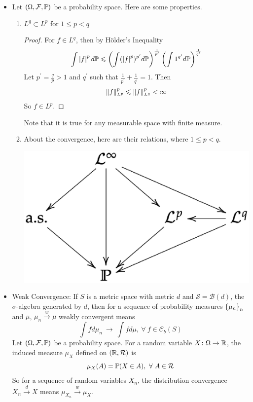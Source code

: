 \documentclass[a4paper,12pt]{article}
\begin{document}
\begin{itemize}
  \item Let $(\Omega,\mathcal{F},\mathbb{P})$ be a probability space. Here are some properties.
  \begin{enumerate}[label=(\arabic*)]
    \item $L^q \subset L^p$ for $1 \leqslant p < q$
    \begin{proof}
      For $f \in L^q$, then by H\"older's Inequality
      \begin{equation*}
        \int \left\lvert f\right\lvert^p d\mathbb{P} \leqslant \left(\int (\left\lvert f\right\lvert^p)^{p^{\prime}} d\mathbb{P}\right)^{\frac{1}{p^{\prime}}}\left(\int 1^{q^{\prime}} d\mathbb{P}\right)^{\frac{1}{q^{\prime}}}
      \end{equation*}
      Let $p^{\prime} = \frac{q}{p} > 1$ and $q^{\prime}$ such that $\frac{1}{p^{\prime}}+\frac{1}{q^{\prime}}=1$. Then
      \begin{equation*}
        \left\lVert f\right\lVert_{L^p}^p \leqslant \left\lVert f\right\lVert_{L^q}^{p} < \infty
      \end{equation*}
      So $f \in L^p$.
    \end{proof}
    Note that it is true for any measurable space with finite measure.

    \item About the convergence, here are their relations, where $1 \leqslant p < q$.
    \begin{center}
      \includegraphics[scale=0.5]{1.eps}
    \end{center}
  \end{enumerate}

  \item Weak Convergence: If $S$ is a metric space with metric $d$ and $\mathcal{S} = \mathcal{B}(d)$, the $\sigma$-algebra generated by $d$, then for a sequence of probability measures $\left\{\mu_n\right\}_n$ and $\mu$, $\mu_n \xrightarrow{w} \mu$ weakly convergent means
  \begin{equation*}
    \int f d\mu_n~ \longrightarrow ~ \int f d\mu,~\forall~f \in \mathcal{C}_b(S)
  \end{equation*}
  Let $(\Omega,\mathcal{F},\mathbb{P})$ be a probability space. For a random variable $X \colon \Omega \rightarrow \mathbb{R}$, the induced measure $\mu_X$ defined on $(\mathbb{R},\mathcal{R})$ is
  \begin{equation*}
    \mu_X(A) = \mathbb{P}(X \in A),~\forall~A \in \mathcal{R}
  \end{equation*}
  So for a sequence of random variables $X_n$, the distribution convergence $X_n \xrightarrow{d} X$ means $\mu_{X_n} \xrightarrow{w} \mu_X$.


\end{itemize}
\end{document}
